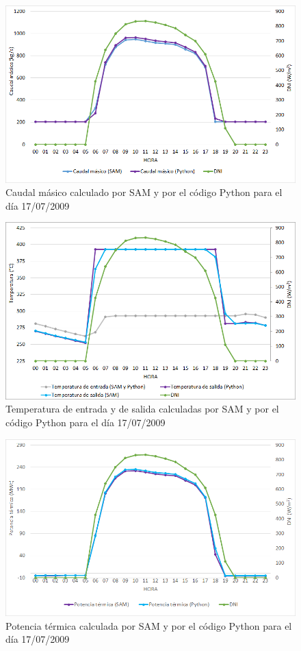 \begin{figure}
\includegraphics[width=0.9\linewidth]{images/177caudal.png}
\caption{Caudal másico calculado por SAM y por el código Python para el día 17/07/2009} 
\label{fig:177caudal}
\end{figure}

\begin{figure}
\includegraphics[width=0.9\linewidth]{images/177temperatura.png}
\caption{Temperatura de entrada y de salida calculadas por SAM y por el código Python para el día 17/07/2009} 
\label{fig:177temperatura}
\end{figure}

\begin{figure}
\includegraphics[width=0.9\linewidth]{images/177potencia.png}
\caption{Potencia térmica calculada por SAM y por el código Python para el día 17/07/2009} 
\label{fig:177potencia}
\end{figure}

